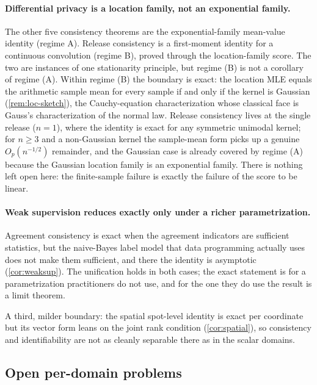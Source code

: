 \paragraph{Differential privacy is a location family, not an
exponential family.} The other five consistency theorems are the
exponential-family mean-value identity (regime A). Release consistency
is a first-moment identity for a continuous convolution (regime B),
proved through the location-family score. The two are instances of one
stationarity principle, but regime (B) is not a corollary of regime
(A). Within regime (B) the boundary is exact: the location MLE equals
the arithmetic sample mean for every sample if and only if the kernel
is Gaussian (\cref{rem:loc-sketch}), the Cauchy-equation characterization
whose classical face is Gauss's characterization of the normal law.
Release consistency lives at the single release ($n = 1$), where the
identity is exact for any symmetric unimodal kernel; for $n \ge 3$ and a
non-Gaussian kernel the sample-mean form picks up a genuine
$O_p(n^{-1/2})$ remainder, and the Gaussian case is already covered by
regime (A) because the Gaussian location family is an exponential
family. There is nothing left open here: the finite-sample failure is
exactly the failure of the score to be linear.

\paragraph{Weak supervision reduces exactly only under a richer
parametrization.} Agreement consistency is exact when the agreement
indicators are sufficient statistics, but the naive-Bayes label model
that data programming actually uses does not make them sufficient, and
there the identity is asymptotic (\cref{cor:weaksup}). The unification
holds in both cases; the exact statement is for a parametrization
practitioners do not use, and for the one they do use the result is a
limit theorem.

A third, milder boundary: the spatial spot-level identity is exact per
coordinate but its vector form leans on the joint rank condition
(\cref{cor:spatial}), so consistency and identifiability are not as
cleanly separable there as in the scalar domains.

\subsection{Open per-domain problems}

